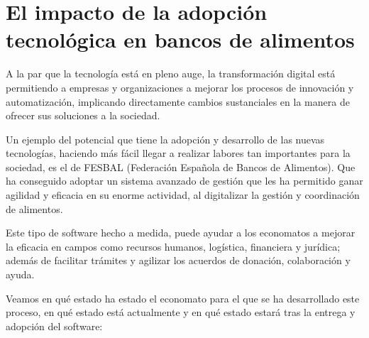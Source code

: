 \section{El impacto de la adopción tecnológica en bancos de alimentos}
A la par que la tecnología está en pleno auge, la transformación digital está permitiendo a empresas y organizaciones a mejorar los procesos de innovación y automatización, implicando directamente cambios sustanciales en la manera de ofrecer sus soluciones a la sociedad.
\vspace{1em}
\par Un ejemplo del potencial que tiene la adopción y desarrollo de las nuevas tecnologías, haciendo más fácil llegar a realizar labores tan importantes para la sociedad, es el de FESBAL (Federación Española de Bancos de Alimentos). Que ha conseguido adoptar un sistema avanzado de gestión que les ha permitido ganar agilidad y eficacia en su enorme actividad, al digitalizar la gestión y coordinación de alimentos.
\vspace{1em}
\par Este tipo de software hecho a medida, puede ayudar a los economatos a mejorar la eficacia en campos como recursos humanos, logística, financiera y jurídica; además de facilitar trámites y agilizar los acuerdos de donación, colaboración y ayuda.
\vspace{1em}
\par Veamos en qué estado ha estado el economato para el que se ha desarrollado este proceso, en qué estado está actualmente y en qué estado estará tras la entrega y adopción del software:

